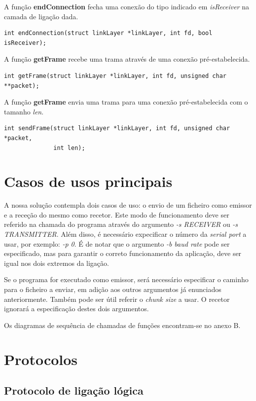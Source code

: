 \documentclass[11pt]{report}
\begin{document}
A função \textbf{endConnection} fecha uma conexão do tipo indicado em \textit{isReceiver}
na camada de ligação dada.
\begin{lstlisting}
int endConnection(struct linkLayer *linkLayer, int fd, bool isReceiver);
\end{lstlisting}

A função \textbf{getFrame} recebe uma trama através de uma conexão pré-estabelecida.
\begin{lstlisting}
int getFrame(struct linkLayer *linkLayer, int fd, unsigned char **packet);
\end{lstlisting}

A função \textbf{getFrame} envia uma trama para uma conexão pré-estabelecida com o tamanho
\textit{len}.
\begin{lstlisting}
int sendFrame(struct linkLayer *linkLayer, int fd, unsigned char *packet,
              int len);
\end{lstlisting}

{\let\clearpage\relax \chapter{Casos de usos principais}}

A nossa solução contempla dois casos de uso: o envio de um ficheiro como emissor
e a receção do mesmo como recetor. Este modo de funcionamento deve ser referido
na chamada do programa através do argumento \textit{-s RECEIVER} ou
\textit{-s TRANSMITTER}. Além disso, é necessário expecificar o número da
\textit{serial port} a usar, por exemplo: \textit{-p 0}. É de notar que o
argumento \textit{-b baud rate} pode ser especificado, mas para garantir o
correto funcionamento da aplicação, deve ser igual nos dois extremos da ligação.

Se o programa for executado como emissor, será necessário especificar o caminho
para o ficheiro a enviar, em adição aos outros argumentos já enunciados
anteriormente. Também pode ser útil referir o \textit{chunk size} a usar. O
recetor ignorará a especificação destes dois argumentos.

Os diagramas de sequência de chamadas de funções encontram-se no anexo B.

{\let\clearpage\relax \chapter{Protocolos}}

\section{Protocolo de ligação lógica}
\end{document}
